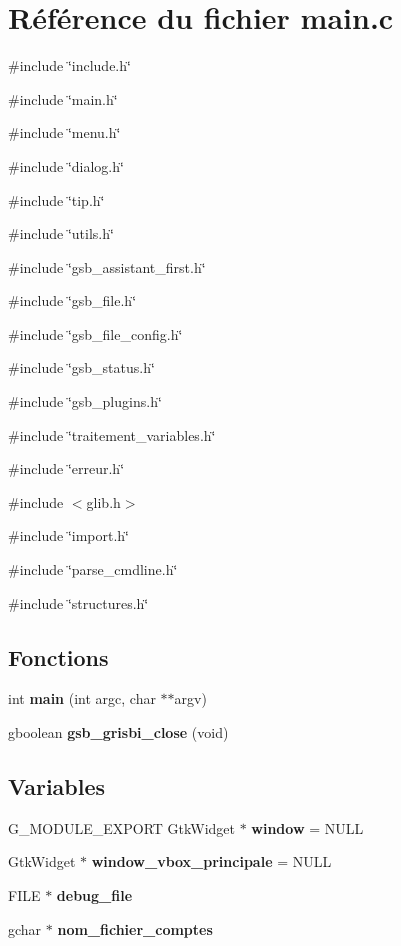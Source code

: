 \section{Référence du fichier main.c}
\label{main_8c}
{\ttfamily \#include \char`\"{}include.h\char`\"{}}\par
{\ttfamily \#include \char`\"{}main.h\char`\"{}}\par
{\ttfamily \#include \char`\"{}menu.h\char`\"{}}\par
{\ttfamily \#include \char`\"{}dialog.h\char`\"{}}\par
{\ttfamily \#include \char`\"{}tip.h\char`\"{}}\par
{\ttfamily \#include \char`\"{}utils.h\char`\"{}}\par
{\ttfamily \#include \char`\"{}gsb\_\-assistant\_\-first.h\char`\"{}}\par
{\ttfamily \#include \char`\"{}gsb\_\-file.h\char`\"{}}\par
{\ttfamily \#include \char`\"{}gsb\_\-file\_\-config.h\char`\"{}}\par
{\ttfamily \#include \char`\"{}gsb\_\-status.h\char`\"{}}\par
{\ttfamily \#include \char`\"{}gsb\_\-plugins.h\char`\"{}}\par
{\ttfamily \#include \char`\"{}traitement\_\-variables.h\char`\"{}}\par
{\ttfamily \#include \char`\"{}erreur.h\char`\"{}}\par
{\ttfamily \#include $<$glib.h$>$}\par
{\ttfamily \#include \char`\"{}import.h\char`\"{}}\par
{\ttfamily \#include \char`\"{}parse\_\-cmdline.h\char`\"{}}\par
{\ttfamily \#include \char`\"{}structures.h\char`\"{}}\par
\subsection*{Fonctions}
\begin{DoxyCompactItemize}
\item 
int {\bf main} (int argc, char $\ast$$\ast$argv)
\item 
gboolean {\bf gsb\_\-grisbi\_\-close} (void)
\end{DoxyCompactItemize}
\subsection*{Variables}
\begin{DoxyCompactItemize}
\item 
G\_\-MODULE\_\-EXPORT GtkWidget $\ast$ {\bf window} = NULL
\item 
GtkWidget $\ast$ {\bf window\_\-vbox\_\-principale} = NULL
\item 
FILE $\ast$ {\bf debug\_\-file}
\item 
gchar $\ast$ {\bf nom\_\-fichier\_\-comptes}
\end{DoxyCompactItemize}


